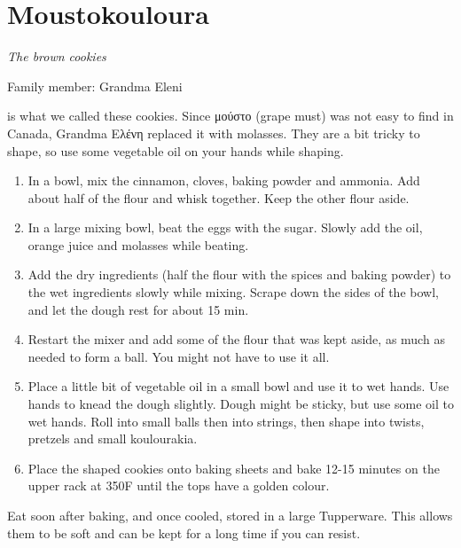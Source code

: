 \chapter{Moustokouloura}
\label{ch:moustokouloura}


\textit{The brown cookies}

Family member: Grandma Eleni

 is what we called these cookies. Since \textgreek{μούστο} (grape must) was not easy to find in Canada, Grandma \textgreek{Ελένη} replaced it with molasses. They are a bit tricky to shape, so use some vegetable oil on your hands while shaping.

\begin{enumerate}
    \item In a bowl, mix the cinnamon, cloves, baking powder and ammonia. Add about half of the flour and whisk together. Keep the other flour aside.
    \item In a large mixing bowl, beat the eggs with the sugar. Slowly add the oil, orange juice and molasses while beating.
    \item Add the dry ingredients (half the flour with the spices and baking powder) to the wet ingredients slowly while mixing. Scrape down the sides of the bowl, and let the dough rest for about 15 min.
    \item Restart the mixer and add some of the flour that was kept aside, as much as needed to form a ball. You might not have to use it all.
    \item Place a little bit of vegetable oil in a small bowl and use it to wet hands. Use hands to knead the dough slightly. Dough might be sticky, but use some oil to wet hands. Roll into small balls then into strings, then shape into twists, pretzels and small koulourakia.
    \item Place the shaped cookies onto baking sheets and bake 12-15 minutes on the upper rack at 350\degree F until the tops have a golden colour.
\end{enumerate}

Eat soon after baking, and once cooled, stored in a large Tupperware. This allows them to be soft and can be kept for a long time if you can resist.

